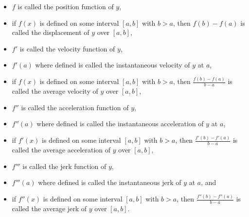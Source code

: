 \documentclass[a4paper,12pt]{report}
\begin{document}
\begin{itemize}
\begin{itemize}
If $f$ is Fréchet differentiable at all point in $I\subseteq U$, we say $f$ is Fréchet differentiable on $I$; if $f$ is Fréchet differentiable on $U$, we say $f$ is Fréchet differentiable. If $D^{(n-1)}f$ exists and is Fréchet differentiable at all point in $I\subseteq U$, we say $f$ is $n$-times Fréchet differentiable on $I$; if $D^{(n-1)}f$ exists and is Fréchet differentiable on $U$, we say $f$ is $n$-times Fréchet differentiable.

The operation of finding the Fréchet derivative or Fréchet derivative function is called Fréchet differentiation (弗蘭歇微分), ordinary differentiation, or differentiation.

Specifically, the $0$th(-order) Fréchet derivative of $f$ is $f$ itself.

If $y=f(x)$ is defined on some interval $[a,b]$ with $b>a$, then $\frac{f(b)-f(a)}{b-a}$ is called the average rate of change of $y$ with repsect to $x$ over $[a,b]$.
\subsubsection{Physical interpretation}
Let $f$ be a function with domain being $\bbR$ or $\bbR_{\geq 0}$. If we interprets $f(t)$ as the position of $y$ at time $t$, then:
\bit
\item $f$ is called the position function of $y$,
\item if $f(x)$ is defined on some interval $[a,b]$ with $b>a$, then $f(b)-f(a)$ is called the displacement of $y$ over $[a,b]$,
\item $f'$ is called the velocity function of $y$,
\item $f'(a)$ where defined is called the instantaneous velocity of $y$ at $a$,
\item if $f(x)$ is defined on some interval $[a,b]$ with $b>a$, then $\frac{f(b)-f(a)}{b-a}$ is called the average velocity of $y$ over $[a,b]$,
\item $f''$ is called the acceleration function of $y$,
\item $f''(a)$ where defined is called the instantaneous acceleration of $y$ at $a$,
\item if $f'(x)$ is defined on some interval $[a,b]$ with $b>a$, then $\frac{f'(b)-f'(a)}{b-a}$ is called the average acceleration of $y$ over $[a,b]$,
\item $f'''$ is called the jerk function of $y$,
\item $f'''(a)$ where defined is called the instantaneous jerk of $y$ at $a$, and
\item if $f''(x)$ is defined on some interval $[a,b]$ with $b>a$, then $\frac{f''(b)-f''(a)}{b-a}$ is called the average jerk of $y$ over $[a,b]$.
\eit

\end{itemize}
\end{itemize}
\end{document}
